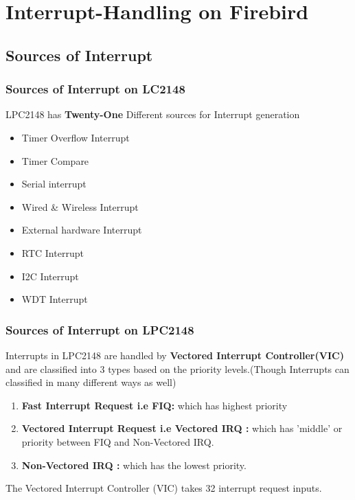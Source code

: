 \documentclass[table,10pt,red]{beamer}
\begin{document}
\section{Interrupt-Handling on Firebird}
\subsection{Sources of Interrupt}
\begin{frame}
		\frametitle{Sources of Interrupt on LC2148}\pause
			LPC2148 has \textbf{Twenty-One} Different sources for Interrupt generation \pause \\[8pt]
			\begin{itemize}
				\item <3-> Timer Overflow Interrupt \\[8pt]
				\item <4-> Timer Compare \\[8pt]
				\item <5-> Serial interrupt \\[8pt]
				\item <6-> Wired \& Wireless Interrupt \\[8pt]
				\item <7-> External hardware Interrupt  \\[8pt]	
				\item <8-> RTC Interrupt  \\[8pt]
				\item <9-> I2C Interrupt  \\[8pt]
				\item <10-> WDT Interrupt  \\[8pt]
			\end{itemize}\pause
\end{frame}
\begin{frame}
	\frametitle{Sources of Interrupt on LPC2148}\pause
	Interrupts in LPC2148 are handled by \textbf{Vectored Interrupt Controller(VIC)} and are classified into 3 types based on the priority levels.(Though Interrupts can classified in many different ways as well) \\[12pt] \pause
	\begin{enumerate}
		\item \textbf{Fast Interrupt Request i.e FIQ:} which has highest priority \\[5pt] \pause
		\item \textbf{Vectored Interrupt Request i.e Vectored IRQ :} which has 'middle' or priority between FIQ and Non-Vectored IRQ. \\[5pt] \pause
		\item \textbf{Non-Vectored IRQ :} which has the lowest priority. \\[5pt] \pause
	\end{enumerate} 
	 The Vectored Interrupt Controller (VIC) takes 32 interrupt request inputs. \pause
\end{frame}
\end{document}
